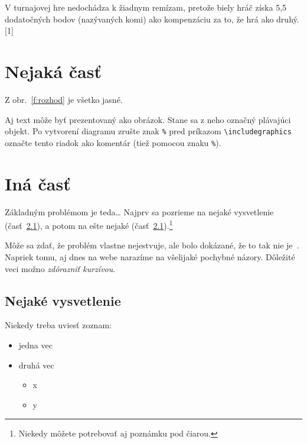 \documentclass[10pt,twoside,slovak,a4paper]{article}
\begin{document}
V turnajovej hre nedochádza k žiadnym remízam, pretože biely hráč získa 5,5 dodatočných bodov (nazývaných komi) ako kompenzáciu za to, že hrá ako druhý.[1]
\section{Nejaká časť} \label{nejaka}

Z obr.~\ref{f:rozhod} je všetko jasné. 

\begin{figure*}[tbh]
\centering
Aj text môže byť prezentovaný ako obrázok. Stane sa z neho označný plávajúci objekt. Po vytvorení diagramu zrušte znak \texttt{\%} pred príkazom \verb|\includegraphics| označte tento riadok ako komentár (tiež pomocou znaku \texttt{\%}).
\caption{Rozhodujúci argument.}
\label{f:rozhod}
\end{figure*}



\section{Iná časť} \label{ina}

Základným problémom je teda\ldots{} Najprv sa pozrieme na nejaké vysvetlenie (časť~\ref{ina:nejake}), a potom na ešte nejaké (časť~\ref{ina:nejake}).\footnote{Niekedy môžete potrebovať aj poznámku pod čiarou.}

Môže sa zdať, že problém vlastne nejestvuje\cite{Coplien:MPD}, ale bolo dokázané, že to tak nie je~\cite{Czarnecki:Staged, Czarnecki:Progress}. Napriek tomu, aj dnes na webe narazíme na všelijaké pochybné názory\cite{PLP-Framework}. Dôležité veci možno \emph{zdôrazniť kurzívou}.


\subsection{Nejaké vysvetlenie} \label{ina:nejake}

Niekedy treba uviesť zoznam:

\begin{itemize}
\item jedna vec
\item druhá vec
	\begin{itemize}
	\item x
	\item y
	\end{itemize}
\end{itemize}
\end{document}

